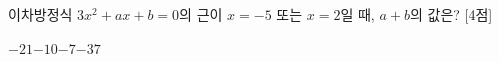 이차방정식 $3x^2+ax+b=0$의 근이 $x=-5$ 또는 $x=2$일 때, $a+b$의 값은?  \mbox{[4점]}
\begin{choices32}{$-21$}{$-10$}{$-7$}{$-3$}{$7$}\end{choices32}
